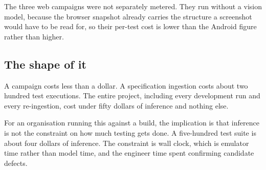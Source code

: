 The three web campaigns were not separately metered. They run without a vision
model, because the browser snapshot already carries the structure a screenshot
would have to be read for, so their per-test cost is lower than the Android
figure rather than higher.

\subsection{The shape of it}

A campaign costs less than a dollar. A specification ingestion costs about two
hundred test executions. The entire project, including every development run
and every re-ingestion, cost under fifty dollars of inference and nothing else.

For an organisation running this against a build, the implication is that
inference is not the constraint on how much testing gets done. A five-hundred
test suite is about four dollars of inference. The constraint is wall clock,
which is emulator time rather than model time, and the engineer time spent
confirming candidate defects.

